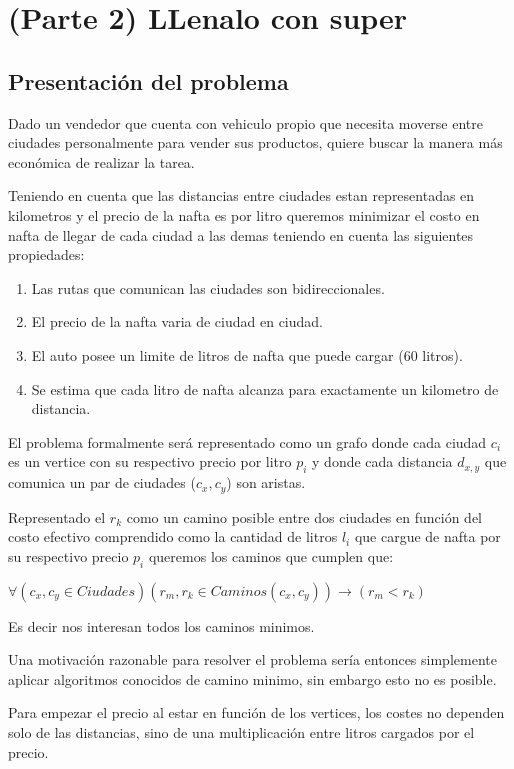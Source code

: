 \documentclass[12pt]{article}
\begin{document}
\section*{(Parte 2) LLenalo con super}

\subsection*{Presentación del problema}
Dado un vendedor que cuenta con vehiculo propio que necesita moverse entre ciudades personalmente para vender sus productos, quiere buscar la manera más económica de realizar la tarea.

Teniendo en cuenta que las distancias entre ciudades estan representadas en kilometros y el precio de la nafta es por litro queremos minimizar el costo en nafta de llegar de cada ciudad a las demas teniendo en cuenta las siguientes propiedades: 

\begin{enumerate}
    \item Las rutas que comunican las ciudades son bidireccionales.
    \item El precio de la nafta varia de ciudad en ciudad.
    \item El auto posee un limite de litros de nafta que puede cargar (60 litros).
    \item Se estima que cada litro de nafta alcanza para exactamente un kilometro de distancia.
\end{enumerate}

El problema formalmente será representado como un grafo donde cada ciudad
 $c_i$ es un vertice con su respectivo precio por litro $p_i$ y donde 
 cada distancia $d_{x,y}$ que comunica un par de ciudades ($c_x, c_y$) son aristas.

Representado el $r_k$ como un camino posible entre dos ciudades en función del costo efectivo
comprendido como la cantidad de litros $l_i$ que cargue de nafta por su respectivo precio $p_i$ queremos los caminos que cumplen que:

$\forall(c_x, c_y \in Ciudades)(r_{m}, r_k \in Caminos(c_x,c_y))\rightarrow(r_{m} < r_k)$

Es decir nos interesan todos los caminos minimos.

Una motivación razonable para resolver el problema sería entonces simplemente aplicar algoritmos conocidos de camino minimo, sin embargo esto no es posible.

Para empezar el precio al estar en función de los vertices, los costes no dependen solo de las distancias, sino de una multiplicación entre litros cargados por el precio.
\end{document}
